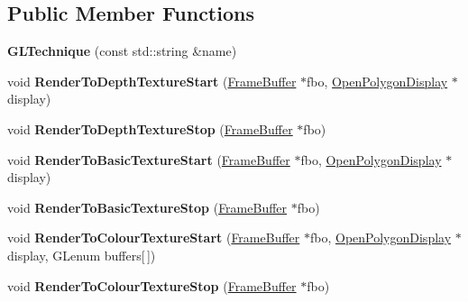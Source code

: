 \subsection*{Public Member Functions}
\begin{DoxyCompactItemize}
\item 
\hypertarget{classEngine_1_1GLTechnique_a403e96effab192546279fe30079fb877}{}{\bfseries G\+L\+Technique} (const std\+::string \&name)\label{classEngine_1_1GLTechnique_a403e96effab192546279fe30079fb877}

\item 
\hypertarget{classEngine_1_1GLTechnique_aab149c687afdf57164ab1597e08e3ebd}{}void {\bfseries Render\+To\+Depth\+Texture\+Start} (\hyperlink{classEngine_1_1FrameBuffer}{Frame\+Buffer} $\ast$fbo, \hyperlink{classEngine_1_1OpenPolygonDisplay}{Open\+Polygon\+Display} $\ast$display)\label{classEngine_1_1GLTechnique_aab149c687afdf57164ab1597e08e3ebd}

\item 
\hypertarget{classEngine_1_1GLTechnique_afd809fd7e8b1bc4e09acd4201aff81f5}{}void {\bfseries Render\+To\+Depth\+Texture\+Stop} (\hyperlink{classEngine_1_1FrameBuffer}{Frame\+Buffer} $\ast$fbo)\label{classEngine_1_1GLTechnique_afd809fd7e8b1bc4e09acd4201aff81f5}

\item 
\hypertarget{classEngine_1_1GLTechnique_a219f5a080c241e893c52813e23ef2fd0}{}void {\bfseries Render\+To\+Basic\+Texture\+Start} (\hyperlink{classEngine_1_1FrameBuffer}{Frame\+Buffer} $\ast$fbo, \hyperlink{classEngine_1_1OpenPolygonDisplay}{Open\+Polygon\+Display} $\ast$display)\label{classEngine_1_1GLTechnique_a219f5a080c241e893c52813e23ef2fd0}

\item 
\hypertarget{classEngine_1_1GLTechnique_a9f68b1a23c48312fe50ea9be84d7b891}{}void {\bfseries Render\+To\+Basic\+Texture\+Stop} (\hyperlink{classEngine_1_1FrameBuffer}{Frame\+Buffer} $\ast$fbo)\label{classEngine_1_1GLTechnique_a9f68b1a23c48312fe50ea9be84d7b891}

\item 
\hypertarget{classEngine_1_1GLTechnique_afab4b07e70b837bc55acf97c3d09798a}{}void {\bfseries Render\+To\+Colour\+Texture\+Start} (\hyperlink{classEngine_1_1FrameBuffer}{Frame\+Buffer} $\ast$fbo, \hyperlink{classEngine_1_1OpenPolygonDisplay}{Open\+Polygon\+Display} $\ast$display, G\+Lenum buffers\mbox{[}$\,$\mbox{]})\label{classEngine_1_1GLTechnique_afab4b07e70b837bc55acf97c3d09798a}

\item 
\hypertarget{classEngine_1_1GLTechnique_a5c6be24fa37bfa63759c31c28f95c360}{}void {\bfseries Render\+To\+Colour\+Texture\+Stop} (\hyperlink{classEngine_1_1FrameBuffer}{Frame\+Buffer} $\ast$fbo)\label{classEngine_1_1GLTechnique_a5c6be24fa37bfa63759c31c28f95c360}

\end{DoxyCompactItemize}
